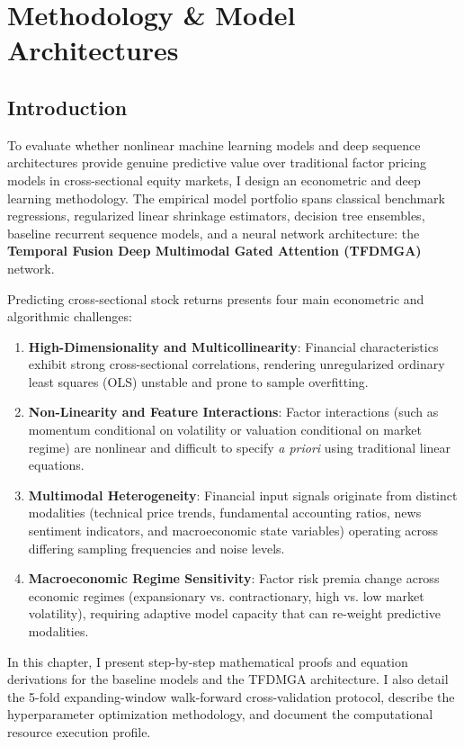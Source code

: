 \chapter{Methodology \& Model Architectures}
\label{ch:methodology}

\section{Introduction}
To evaluate whether nonlinear machine learning models and deep sequence architectures provide genuine predictive value over traditional factor pricing models in cross-sectional equity markets, I design an econometric and deep learning methodology. The empirical model portfolio spans classical benchmark regressions, regularized linear shrinkage estimators, decision tree ensembles, baseline recurrent sequence models, and a neural network architecture: the \textbf{Temporal Fusion Deep Multimodal Gated Attention (TFDMGA)} network.

Predicting cross-sectional stock returns presents four main econometric and algorithmic challenges:
\begin{enumerate}
    \item \textbf{High-Dimensionality and Multicollinearity}: Financial characteristics exhibit strong cross-sectional correlations, rendering unregularized ordinary least squares (OLS) unstable and prone to sample overfitting.
    \item \textbf{Non-Linearity and Feature Interactions}: Factor interactions (such as momentum conditional on volatility or valuation conditional on market regime) are nonlinear and difficult to specify \textit{a priori} using traditional linear equations.
    \item \textbf{Multimodal Heterogeneity}: Financial input signals originate from distinct modalities (technical price trends, fundamental accounting ratios, news sentiment indicators, and macroeconomic state variables) operating across differing sampling frequencies and noise levels.
    \item \textbf{Macroeconomic Regime Sensitivity}: Factor risk premia change across economic regimes (expansionary vs. contractionary, high vs. low market volatility), requiring adaptive model capacity that can re-weight predictive modalities.
\end{enumerate}

In this chapter, I present step-by-step mathematical proofs and equation derivations for the baseline models and the TFDMGA architecture. I also detail the 5-fold expanding-window walk-forward cross-validation protocol, describe the hyperparameter optimization methodology, and document the computational resource execution profile.

